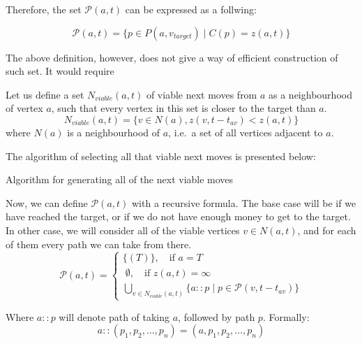 \documentclass[12pt]{article}
\newcommand*{\p}{\ensuremath{\mathcal{P}}}
\newcommand*{\target}{\ensuremath{v_{target}}}
\begin{document}
Therefore, the set $\p(a,t)$ can be expressed as a follwing:

\begin{equation*}
    \p(a,t) = \big\{ p \in P(a,\target) \mid C(p) = z(a,t) \big\}
\end{equation*}

The above definition, however, does not give a way of efficient construction of such set.
It would require

Let us define a set $N_{viable}(a,t)$ of viable next moves from $a$ as a neighbourhood of vertex $a$, such that
every vertex in this set is closer to the target than $a$.
\begin{equation}
    N_{viable}(a,t) = \big\{ v \in N(a) , z(v,t-t_{av}) < z(a, t) \big\}
\end{equation}
where $N(a)$ is a neighbourhood of $a$, i.e.\ a set of all vertices adjacent to $a$.

The algorithm of selecting all that viable next moves is presented below:

\begin{algorithm}
    \DontPrintSemicolon
    \caption{Algorithm for generating all of the next viable moves}
    \label{alg:viable_next_moves}
\end{algorithm}

Now, we can define $\p(a,t)$ with a recursive formula.
The base case will be if we have reached the target, or if we do not have enough money to get to the target.
In other case, we will consider all of the viable vertices $v \in N(a,t)$, and for each of them every path we can take from there.
\begin{equation}
    \p(a,t) =
    \begin{cases}
        \big\{ (T) \big\}, \quad \text{if $a = T$}     \\[1ex]
        \;\emptyset, \quad \text{if $z(a,t) = \infty$} \\[1ex]
        \bigcup\limits_{v \in N_{viable}(a,t)} \Big\{ a::p \mid p \in \p(v, t-t_{av}) \Big\}
    \end{cases}
\end{equation}

Where $a :: p$ will denote path of taking $a$, followed by path $p$.
Formally:
\begin{equation*}
    a :: (p_1, p_2, \ldots, p_n) = (a, p_1, p_2, \ldots, p_n)
\end{equation*}
\end{document}
